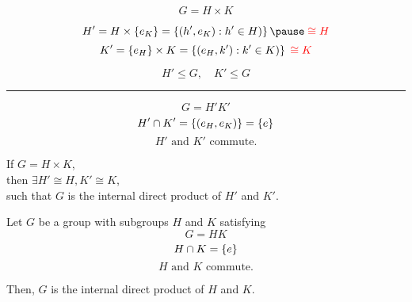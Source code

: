 
\begin{frame}{}
  \[
	G = H \times K
  \]

  \pause
  \begin{definition}
	\[
	  H' = H \times \set{e_{K}} = \set{(h', e_{K}): h' \in H)} \pause \;\red{\cong H}
	\]
	\pause \vspace{-0.50cm}
	\[
	  K' = \left\{e_{H}\right\} \times K = \left\{(e_{H}, k'): k' \in K)\right\} \;\textcolor{red}{\cong K}
	\]
  \end{definition}

  \pause
  \[
	H' \le G, \quad K' \le G
  \]

  \pause
  \vspace{-0.60cm}
  \begin{center}
	\rule{8cm}{0.6pt}
  \end{center}
  \vspace{-0.60cm}

  \[
	G = H'K'
  \]
  \pause \vspace{-0.30cm}
  \[
	H' \cap K' = \left\{(e_{H}, e_{K})\right\} = \left\{e\right\}
  \]
  \pause \vspace{-0.30cm}
  \[
	H' \text{ and } K' \text{ commute}.
  \]
\end{frame}

\begin{frame}{}
  \begin{theorem}
	\begin{center}
	  If $G = H \times K$, \\[5pt]
	  then $\exists H' \cong H, K' \cong K$, \\[5pt]
	  such that $G$ is the internal direct product of $H'$ and $K'$.
	\end{center}
  \end{theorem}

  \pause
  \vspace{0.50cm}
  \begin{definition}
	Let $G$ be a group with subgroups $H$ and $K$ satisfying
	\[
	  G = HK
	\]
	\[
	  H \cap K = \left\{e\right\}
	\]
	\[
	  H \text{ and } K \text{ commute}.
	\]

	Then, $G$ is the internal direct product of $H$ and $K$.
  \end{definition}
\end{frame}


